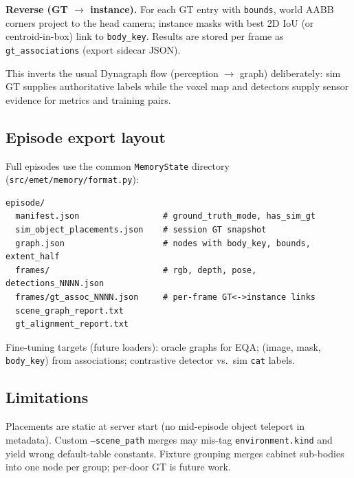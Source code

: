 \textbf{Reverse (GT $\rightarrow$ instance).}
For each GT entry with \texttt{bounds}, world AABB corners project to the head camera; instance masks with best 2D IoU (or centroid-in-box) link to \texttt{body\_key}.
Results are stored per frame as \texttt{gt\_associations} (export sidecar JSON).

This inverts the usual Dynagraph flow (perception $\rightarrow$ graph) deliberately: sim GT supplies authoritative labels while the voxel map and detectors supply sensor evidence for metrics and training pairs.

\subsection{Episode export layout}

Full episodes use the common \texttt{MemoryState} directory (\texttt{src/emet/memory/format.py}):

\begin{verbatim}
episode/
  manifest.json                 # ground_truth_mode, has_sim_gt
  sim_object_placements.json    # session GT snapshot
  graph.json                    # nodes with body_key, bounds, extent_half
  frames/                       # rgb, depth, pose, detections_NNNN.json
  frames/gt_assoc_NNNN.json     # per-frame GT<->instance links
  scene_graph_report.txt
  gt_alignment_report.txt
\end{verbatim}

Fine-tuning targets (future loaders): oracle graphs for EQA; (image, mask, \texttt{body\_key}) from associations; contrastive detector vs.\ sim \texttt{cat} labels.

\subsection{Limitations}

Placements are static at server start (no mid-episode object teleport in metadata).
Custom \texttt{--scene\_path} merges may mis-tag \texttt{environment.kind} and yield wrong default-table constants.
Fixture grouping merges cabinet sub-bodies into one node per group; per-door GT is future work.
